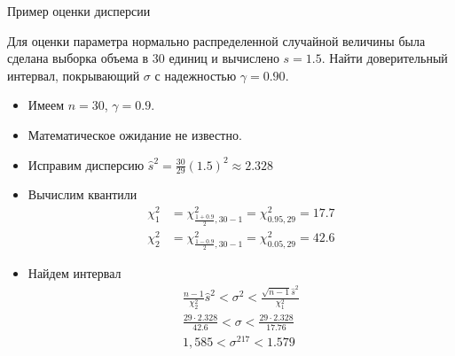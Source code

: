 \documentclass[unicode,11pt,notheorems,xcolor=table]{beamer}
\begin{document}
\begin{frame}[allowframebreaks]{Пример оценки дисперсии}{}
    \begin{exampleblock}{}
        Для оценки параметра нормально распределенной случайной величины была сделана выборка объема в 30 единиц и вычислено $s = 1.5$.
        Найти доверительный интервал, покрывающий $\sigma$ с надежностью $\gamma =  0.90$.
    \end{exampleblock}
    \begin{itemize}
    \item Имеем $n = 30$, $\gamma = 0.9$.
    \item Математическое ожидание не известно.
    \item Исправим дисперсию $\hat{s}^2 = \frac{30}{29} (1.5)^2 \approx 2.328$
    \item Вычислим квантили 
         \begin{align*}
             \chi^2_1 &= \chi^2_{\frac{1+0.9}{2},30-1} = \chi^2_{0.95, 29} =17.7\\
             \chi^2_2 &= \chi^2_{\frac{1-0.9}{2},30-1} = \chi^2_{0.05,29} = 42.6
         \end{align*}
     \item Найдем интервал
     \begin{gather*}
        \frac{n-1}{\chi^2_2}\hat{s}^2 < \sigma^2 < \frac{\sqrt{n-1} \hat{s}^2}{\chi^2_1}\\
         \frac{29 \cdot  2.328}{42.6} < \sigma < \frac{ 29 \cdot 2.328}{17.76}\\
         1,585 < \sigma^217 < 1.579 
     \end{gather*}
    \end{itemize}
\end{frame}
\end{document}
